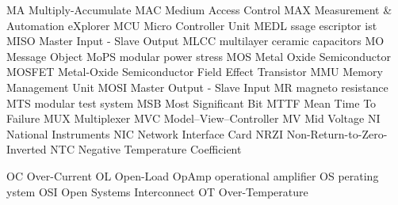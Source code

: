 			{MA}		{Multiply-Accumulate}
		{MAC}		{Medium Access Control}
		{MAX}		{Measurement \& Automation eXplorer}
		{MCU}		{Micro Controller Unit}
		{MEDL}		{ssage escriptor ist}
		{MISO}		{Master Input - Slave Output}
		{MLCC}		{multilayer ceramic capacitors}
			{MO}		{Message Object}
		{MoPS}		{modular power stress}
		{MOS}		{Metal Oxide Semiconductor}
		{MOSFET}	{Metal-Oxide Semiconductor Field Effect Transistor}
		{MMU}		{Memory Management Unit}
		{MOSI}		{Master Output - Slave Input}
			{MR}		{magneto resistance}
			{MTS}		{modular test system}
		{MSB}		{Most Significant Bit}
		{MTTF}		{Mean Time To Failure}
		{MUX}		{Multiplexer}
		{MVC}		{Model–View–Controller}
			{MV}		{Mid Voltage}
			{NI}		{National Instruments}
		{NIC}		{Network Interface Card}
		{NRZI}		{Non-Return-to-Zero-Inverted}
		{NTC}		{Negative Temperature Coefficient}

			{OC}		{Over-Current}
			{OL}		{Open-Load}
		{OpAmp}		{operational amplifier}
			{OS}		{perating ystem}
		{OSI}		{Open Systems Interconnect}
			{OT}		{Over-Temperature}

